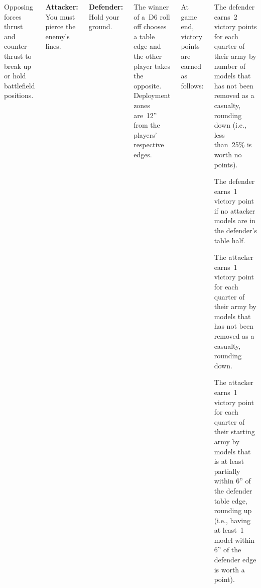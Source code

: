 
\begin{columns}

  Opposing forces thrust and counter-thrust to break up or hold
  battlefield positions.

{\bf Attacker:} You must pierce the enemy's lines.

{\bf Defender:} Hold your ground.

%

The winner of a~D6 roll off chooses a table edge and the other player
takes the opposite.  Deployment zones are~12'' from the players'
respective edges.



%

At game end, victory points are earned as follows:

\begin{squishitemize}
\item The defender earns~2 victory points for each quarter of their
  army by number of models that has not been removed as a casualty,
  rounding down (i.e., less than~25\% is worth no points).

\item The defender earns~1 victory point if no attacker models are in
  the defender's table half.

\item The attacker earns~1 victory point for each quarter of their
  army by models that has not been removed as a casualty, rounding
  down.

\item The attacker earns~1 victory point for each quarter of their
  starting army by models that is at least partially within 6'' of the
  defender table edge, rounding up (i.e., having at least~1 model
  within 6'' of the defender edge is worth a point).

\end{squishitemize}



\end{columns}
